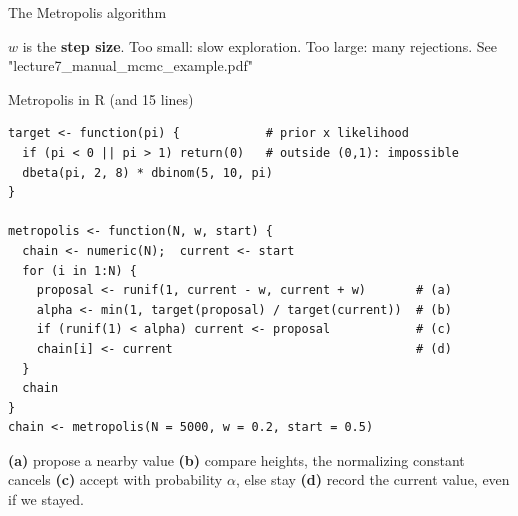 \documentclass[aspectratio=43,11pt]{beamer}
\begin{document}
\begin{frame}{The Metropolis algorithm}
  \begin{center}
  \end{center}
  \small
  $w$ is the \textbf{step size}. Too small: slow exploration.
  Too large: many rejections.
  See "lecture7\_manual\_mcmc\_example.pdf"
\end{frame}

\begin{frame}[fragile]{Metropolis in R (and 15 lines)}
\begin{lstlisting}
target <- function(pi) {            # prior x likelihood
  if (pi < 0 || pi > 1) return(0)   # outside (0,1): impossible
  dbeta(pi, 2, 8) * dbinom(5, 10, pi)
}

metropolis <- function(N, w, start) {
  chain <- numeric(N);  current <- start
  for (i in 1:N) {
    proposal <- runif(1, current - w, current + w)       # (a)
    alpha <- min(1, target(proposal) / target(current))  # (b)
    if (runif(1) < alpha) current <- proposal            # (c)
    chain[i] <- current                                  # (d)
  }
  chain
}
chain <- metropolis(N = 5000, w = 0.2, start = 0.5)
\end{lstlisting}
  \small
  \textbf{(a)} propose a nearby value \textbf{(b)} compare heights, the normalizing constant
  cancels \textbf{(c)} accept with probability $\alpha$, else stay \textbf{(d)} record the
  current value, even if we stayed.
\end{frame}
\end{document}
